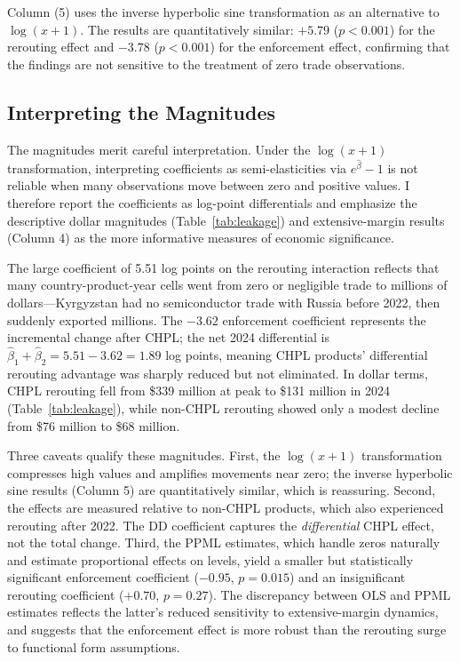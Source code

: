 \documentclass[12pt]{article}
\begin{document}
Column (5) uses the inverse hyperbolic sine transformation as an alternative to $\log(x+1)$. The results are quantitatively similar: $+5.79$ ($p < 0.001$) for the rerouting effect and $-3.78$ ($p < 0.001$) for the enforcement effect, confirming that the findings are not sensitive to the treatment of zero trade observations.

\subsection{Interpreting the Magnitudes}

The magnitudes merit careful interpretation. Under the $\log(x+1)$ transformation, interpreting coefficients as semi-elasticities via $e^{\hat{\beta}} - 1$ is not reliable when many observations move between zero and positive values. I therefore report the coefficients as log-point differentials and emphasize the descriptive dollar magnitudes (Table~\ref{tab:leakage}) and extensive-margin results (Column 4) as the more informative measures of economic significance.

The large coefficient of 5.51 log points on the rerouting interaction reflects that many country-product-year cells went from zero or negligible trade to millions of dollars---Kyrgyzstan had no semiconductor trade with Russia before 2022, then suddenly exported millions. The $-3.62$ enforcement coefficient represents the incremental change after CHPL; the net 2024 differential is $\hat{\beta}_1 + \hat{\beta}_2 = 5.51 - 3.62 = 1.89$ log points, meaning CHPL products' differential rerouting advantage was sharply reduced but not eliminated. In dollar terms, CHPL rerouting fell from \$339 million at peak to \$131 million in 2024 (Table~\ref{tab:leakage}), while non-CHPL rerouting showed only a modest decline from \$76 million to \$68 million.

Three caveats qualify these magnitudes. First, the $\log(x+1)$ transformation compresses high values and amplifies movements near zero; the inverse hyperbolic sine results (Column 5) are quantitatively similar, which is reassuring. Second, the effects are measured relative to non-CHPL products, which also experienced rerouting after 2022. The DD coefficient captures the \textit{differential} CHPL effect, not the total change. Third, the PPML estimates, which handle zeros naturally and estimate proportional effects on levels, yield a smaller but statistically significant enforcement coefficient ($-0.95$, $p = 0.015$) and an insignificant rerouting coefficient ($+0.70$, $p = 0.27$). The discrepancy between OLS and PPML estimates reflects the latter's reduced sensitivity to extensive-margin dynamics, and suggests that the enforcement effect is more robust than the rerouting surge to functional form assumptions.
\end{document}
